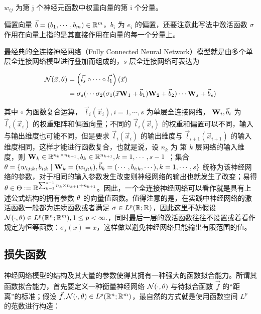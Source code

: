 $w_{i j}$ 为第 j 个神经元函数中权重向量的第 i 个分量。

偏置向量 $\vec{b}=(b_1, \cdots, b_m) \in \R[m]$，$b_i$ 为 $e_i$ 的偏置，还要注意此写法中激活函数 $\sigma$ 作用在向量上指的是其直接作用在向量的每一个分量上。

最经典的全连接神经网络（Fully Connected Neural Network）模型就是由多个单层全连接网络模型进行叠加而组成的，$s$ 层全连接网络可表达为
\newcommand{\NNF}[1][\cdot]{\NN(#1,\params)}

\begin{equation}
    \begin{aligned}
        \NNF[\vec{x}] &= \left( \vec{l_s} \circ \cdots \circ \vec{l_1}\right)(\vec{x}) \\ 
        &= \sigma_s(\cdots\sigma_2(\sigma_1(\vec{x}\matfmt{W}_1 + \vec{b}_1) \matfmt{W}_2 + \vec{b}_2)\cdots\matfmt{W}_s + \vec{b}_s)
    \end{aligned}
\end{equation}

其中 $\circ$ 为函数复合运算， $\vec{l}_i(\vec{x}_i),i=1, \cdots, s$ 为单层全连接网络， $\matfmt{W}_i, \vec{b}_i$ 为 $\vec{l}_i(\vec{x}_i)$ 的权重矩阵和偏置向量；不同的 $\vec{l}_i(\vec{x}_i)$ 的权重和偏置可以不同，输入与输出维度也可能不同，但是要求 $\vec{l}_i(\vec{x}_i)$ 的输出维度与 $\vec{l}_{i+1}(\vec{x}_{i+1})$ 的输入维度相同，这样才能进行函数复合，也就是说，设 $n_k$ 为 第 $k$ 层网络的输入维度，则 $\matfmt{W}_k \in \R[n_k \times n_{k+1}],b_{k} \in \R[n_{k+1}], k=1,\cdots,s-1$ ；集合 $\params =  \{w_{ij;k}, b_{i;k} \mid \matfmt{W}_k = (w_{ij;k}), \vec{b}_k = (\cdots, b_{i;k},\cdots), k=1,\cdots,s \}$ 统称为该神经网络的参数，对于相同的输入参数发生改变则神经网络的输出也就发生了改变；易得 $\params \in \paramset := \R[\sum_{k=1}^{s-1} n_k \times n_{k+1} + n_{k+1}]$。因此，一个全连接神经网络可以看作就是具有上述公式结构的拥有参数 $\params$ 的向量值函数。值得注意的是，在实践中神经网络的激活函数一般都为连续函数或者满足 $\sigma \in L^p (\R; \R) $，因此这里不妨假设 $\NNF \in L^p(\R[n]; \R[m]),1 \le p < \infty.$，同时最后一层的激活函数往往不设置或着看作规定为恒等函数：$\sigma_s (x) = x$，这样做以避免神经网络只能输出有限范围的值。

\subsection{损失函数}\label{sec:Loss}

神经网络模型的结构及其大量的参数使得其拥有一种强大的函数拟合能力。所谓其函数拟合能力，首先要定义一种衡量神经网络 $\NNF$ 与待拟合函数 $\vec{f}$ 的“距离”的标准；假设 $\vec{f}, \NNF \in L^p(\R[n]; \R[m])$，最自然的方式就是使用函数空间 $L^p$ 的范数进行构造：

